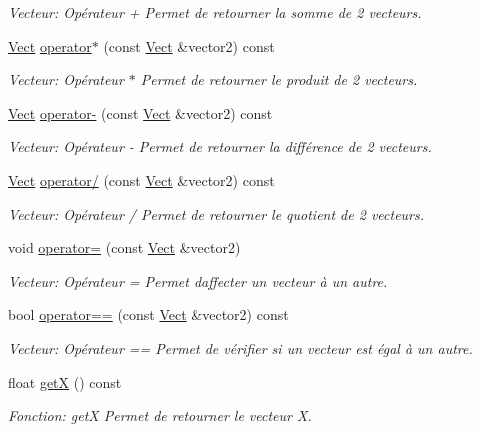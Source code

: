 \begin{DoxyCompactItemize}
\begin{DoxyCompactList}\small\item\em Vecteur\+: Opérateur + Permet de retourner la somme de 2 vecteurs. \end{DoxyCompactList}\item 
\hyperlink{classVect}{Vect} \hyperlink{classVect_ab3dce1a30e0626a88cd726aa0d4f78e5}{operator$\ast$} (const \hyperlink{classVect}{Vect} \&vector2) const
\begin{DoxyCompactList}\small\item\em Vecteur\+: Opérateur $\ast$ Permet de retourner le produit de 2 vecteurs. \end{DoxyCompactList}\item 
\hyperlink{classVect}{Vect} \hyperlink{classVect_a6d4d06eb29739cfc9ab0a658ba534254}{operator-\/} (const \hyperlink{classVect}{Vect} \&vector2) const
\begin{DoxyCompactList}\small\item\em Vecteur\+: Opérateur -\/ Permet de retourner la différence de 2 vecteurs. \end{DoxyCompactList}\item 
\hyperlink{classVect}{Vect} \hyperlink{classVect_a08e7e684ad85024233a59aff86eb5c83}{operator/} (const \hyperlink{classVect}{Vect} \&vector2) const
\begin{DoxyCompactList}\small\item\em Vecteur\+: Opérateur / Permet de retourner le quotient de 2 vecteurs. \end{DoxyCompactList}\item 
void \hyperlink{classVect_a3218ca29a8bf2bc95e99600b2cf385f5}{operator=} (const \hyperlink{classVect}{Vect} \&vector2)
\begin{DoxyCompactList}\small\item\em Vecteur\+: Opérateur = Permet d\textquotesingle{}affecter un vecteur à un autre\textquotesingle{}. \end{DoxyCompactList}\item 
bool \hyperlink{classVect_a4a436a5c1301158cebed48d624aa4a9c}{operator==} (const \hyperlink{classVect}{Vect} \&vector2) const
\begin{DoxyCompactList}\small\item\em Vecteur\+: Opérateur == Permet de vérifier si un vecteur est égal à un autre. \end{DoxyCompactList}\item 
float \hyperlink{classVect_a8925192fe8666b52b2385ff006ab3213}{getX} () const
\begin{DoxyCompactList}\small\item\em Fonction\+: getX Permet de retourner le vecteur X. \end{DoxyCompactList}\item 

\end{DoxyCompactItemize}
